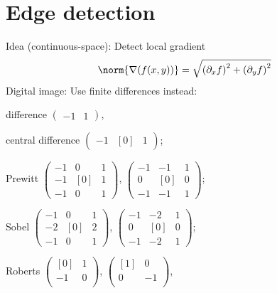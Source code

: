 \section{Edge detection}
	 Idea (continuous-space): Detect local gradient
		\begin{gather*}
			\norm{\nabla(f(x,y))}=\sqrt{\left( \partial_{x}f \right)^2+\left( \partial_{y}f \right)^2}
		\end{gather*}
		Digital image: Use finite differences instead:\\
		\begin{inparadesc}
			\item[difference] 
				$\left(\begin{smallmatrix}
					-1&1
				\end{smallmatrix}\right)$,
			\item[central difference] 
				$\left(\begin{smallmatrix}
					-1&[0]&1
				\end{smallmatrix}\right)$;
			\item[Prewitt] 
				$\left(\begin{smallmatrix}
					-1&0&1\\
					-1&[0]&1\\
					-1&0&1
				\end{smallmatrix}\right)$,
				$\left(\begin{smallmatrix}
					-1&-1&1\\
					0&[0]&0\\
					-1&-1&1
				\end{smallmatrix}\right)$;
			\item[Sobel]
				$\left(\begin{smallmatrix}
					-1&0&1\\
					-2&[0]&2\\
					-1&0&1
				\end{smallmatrix}\right)$,
				$\left(\begin{smallmatrix}
					-1&-2&1\\
					0&[0]&0\\
					-1&-2&1
				\end{smallmatrix}\right)$;
			\item[Roberts]
				$\left(\begin{smallmatrix}
					[0]&1\\
					-1&0\\
				\end{smallmatrix}\right)$,
				$\left(\begin{smallmatrix}
					[1]&0\\
					0&-1\\
				\end{smallmatrix}\right)$,
		\end{inparadesc}
